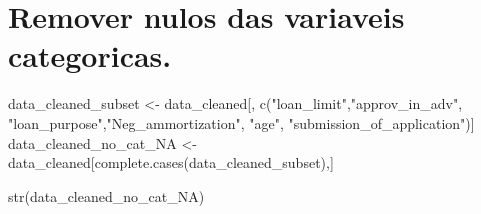 \documentclass[
]{article}
\newenvironment{Shaded}{\begin{snugshade}}{\end{snugshade}}
\newcommand{\FunctionTok}[1]{\textcolor[rgb]{0.00,0.00,0.00}{#1}}
\newcommand{\NormalTok}[1]{#1}
\newcommand{\OtherTok}[1]{\textcolor[rgb]{0.56,0.35,0.01}{#1}}
\newcommand{\StringTok}[1]{\textcolor[rgb]{0.31,0.60,0.02}{#1}}
\begin{document}
\hypertarget{remover-nulos-das-variaveis-categoricas.}{%
\section{Remover nulos das variaveis
categoricas.}\label{remover-nulos-das-variaveis-categoricas.}}

\begin{Shaded}
\begin{Highlighting}[]
\NormalTok{data\_cleaned\_subset }\OtherTok{\textless{}{-}}\NormalTok{ data\_cleaned[, }\FunctionTok{c}\NormalTok{(}\StringTok{"loan\_limit"}\NormalTok{,}\StringTok{"approv\_in\_adv"}\NormalTok{, }\StringTok{"loan\_purpose"}\NormalTok{,}\StringTok{"Neg\_ammortization"}\NormalTok{, }\StringTok{"age"}\NormalTok{, }\StringTok{"submission\_of\_application"}\NormalTok{)]}
\NormalTok{data\_cleaned\_no\_cat\_NA }\OtherTok{\textless{}{-}}\NormalTok{ data\_cleaned[}\FunctionTok{complete.cases}\NormalTok{(data\_cleaned\_subset),]}
\end{Highlighting}
\end{Shaded}

\begin{Shaded}
\begin{Highlighting}[]
\FunctionTok{str}\NormalTok{(data\_cleaned\_no\_cat\_NA)}
\end{Highlighting}
\end{Shaded}
\end{document}
